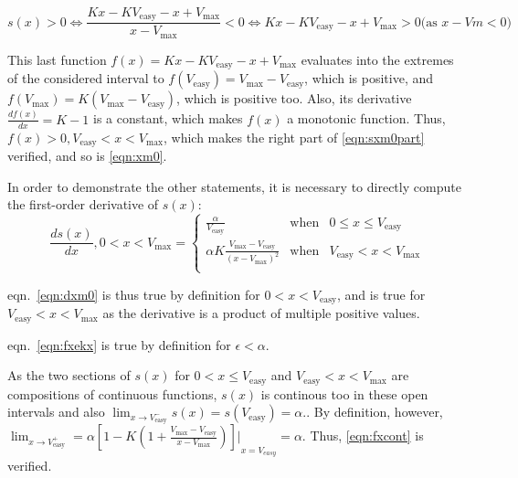 \begin{equation} \label{eqn:sxm0part}
  s(x) > 0 \Leftrightarrow \frac{Kx - KV_{\text{easy}} - x + V_{\text{max}}}{x-V_{\text{max}}} <
  0 \Leftrightarrow Kx-KV_{\text{easy}} -x + V_{\text{max}} > 0 \text{(as } x-Vm < 0 \text{)}
\end{equation}

This last function $f(x) = Kx - KV_{\text{easy}} - x + V_{\text{max}}$ evaluates into the
extremes of the considered interval to $f(V_{\text{easy}}) = V_{\text{max}}-V_{\text{easy}}$, which is positive, and $f(V_{\text{max}}) = K(V_{\text{max}}-V_{\text{easy}})$,
which is positive too. Also, its derivative $\frac{df(x)}{dx}=K-1$ is
a constant, which makes $f(x)$ a monotonic function. Thus, $f(x)>0,
V_{\text{easy}} < x < V_{\text{max}}$, which makes the
right part of \ref{eqn:sxm0part} verified, and so is \ref{eqn:xm0}.

In order to demonstrate the other statements, it is necessary to directly compute the first-order derivative of $s(x)$:
\begin{equation}
  \frac{ds(x)}{dx}, 0 < x < V_{\text{max}}=\left\{
    \begin{array}{lcr}
      \frac{\alpha}{V_{\text{easy}}} & \text{when} & 0 \leq x \leq V_{\text{easy}} \\
      \alpha K \frac{V_{\text{max}}-V_{\text{easy}}}{{\left(x-V_{\text{max}}\right)}^2}
      & \text{when} &  V_{\text{easy}} < x < V_{\text{max}} \\
    \end{array} \right.
\end{equation}

eqn.~\ref{eqn:dxm0} is thus true by definition for $0 < x <
V_{\text{easy}}$, and is true for $ V_{\text{easy}} < x <
V_{\text{max}}$ as the derivative is a product of multiple positive
values.

eqn.~\ref{eqn:fxekx} is true by definition for $\epsilon<\alpha$.

As the two sections of $s(x)$ for $0<x\leq V_{\text{easy}}$ and
$V_{\text{easy}} < x < V_{\text{max}}$ are compositions of continuous
functions, $s(x)$ is continous too in these open intervals and also
$\lim_{x\rightarrow V_{\text{easy}}^-} s(x) = s(V_{\text{easy}})
= \alpha .$. By
definition, however,
$\lim_{x\rightarrow V_{\text{easy}}^+} =
{ {
      \alpha \left[1-K\left(1+\frac{V_{\text{max}}-V_{\text{easy}}}{x-V_{\text{max}}}\right)\right]} \rvert}_{x=V_{easy}}
      = \alpha$. Thus, \ref{eqn:fxcont} is verified.

